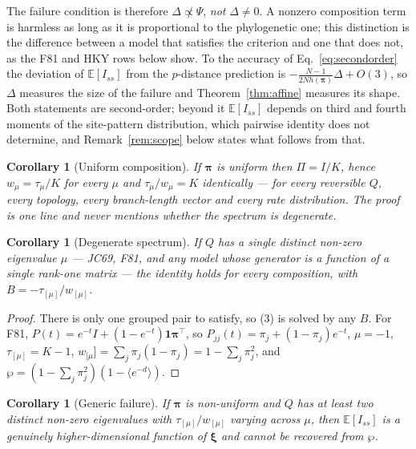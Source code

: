 \documentclass[preprint,12pt,authoryear]{elsarticle}
\newcommand{\Iss}{I_{ss}}
\newcommand{\bpi}{\boldsymbol{\pi}}
\newcommand{\bxi}{\boldsymbol{\xi}}
\newcommand{\E}{\mathbb{E}}
\newtheorem{corollary}[theorem]{Corollary}
\theoremstyle{definition}
\theoremstyle{remark}
\begin{document}
The failure condition is therefore $\Delta\not\propto\Psi$, \emph{not}
$\Delta\ne0$. A nonzero composition term is harmless as long as it is
proportional to the phylogenetic one; this distinction is the difference
between a model that satisfies the criterion and one that does not, as the
F81 and HKY rows below show. To the accuracy of
Eq.~\eqref{eq:secondorder} the deviation of $\E[\Iss]$ from the $p$-distance
prediction is $-\frac{N-1}{2Nh(\bpi)}\Delta+O(3)$, so $\Delta$ measures the
size of the failure and Theorem~\ref{thm:affine} measures its shape. Both
statements are second-order; beyond it $\E[\Iss]$ depends on third and fourth
moments of the site-pattern distribution, which pairwise identity does not
determine, and Remark~\ref{rem:scope} below states what follows from that.

\begin{corollary}[Uniform composition]
\label{cor:uniform}
If $\bpi$ is uniform then $\Pi=I/K$, hence $w_\mu=\tau_\mu/K$ for every
$\mu$ and $\tau_\mu/w_\mu=K$ identically --- for \emph{every} reversible $Q$,
every topology, every branch-length vector and every rate distribution. The
proof is one line and never mentions whether the spectrum is degenerate.
\end{corollary}

\begin{corollary}[Degenerate spectrum]
\label{cor:degenerate}
If $Q$ has a single distinct non-zero eigenvalue $\mu$ --- JC69, F81, and any
model whose generator is a function of a single rank-one matrix --- the
identity holds for \emph{every} composition, with
$B=-\tau_{[\mu]}/w_{[\mu]}$.
\end{corollary}

\begin{proof}
There is only one grouped pair to satisfy, so (3) is solved by any $B$.
For F81, $P(t)=e^{-t}I+(1-e^{-t})\mathbf 1\bpi^{\!\top}$, so
$P_{jj}(t)=\pi_j+(1-\pi_j)e^{-t}$, $\mu=-1$, $\tau_{[\mu]}=K-1$,
$w_{[\mu}]=\sum_j\pi_j(1-\pi_j)=1-\sum_j\pi_j^2$, and
$\wp=(1-\sum_j\pi_j^2)(1-\langle e^{-d}\rangle)$.
\end{proof}

\begin{corollary}[Generic failure]
\label{cor:failure}
If $\bpi$ is non-uniform \emph{and} $Q$ has at least two distinct non-zero
eigenvalues with $\tau_{[\mu]}/w_{[\mu]}$ varying across $\mu$, then $\E[\Iss]$
is a genuinely higher-dimensional function of $\bxi$ and cannot be recovered
from $\wp$.
\end{corollary}
\end{document}

